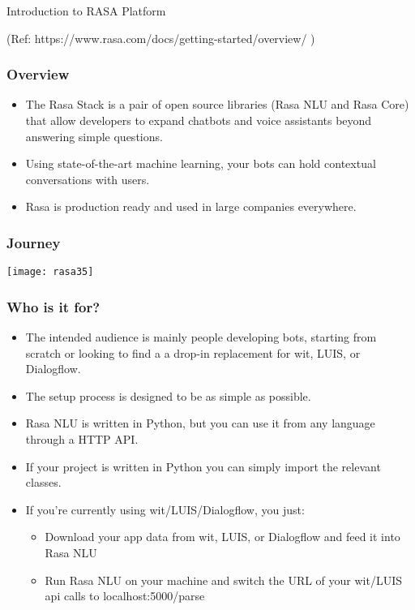 \begin{frame}[fragile]\frametitle{}
\begin{center}
{\Large Introduction to RASA Platform}

{\tiny (Ref: https://www.rasa.com/docs/getting-started/overview/ )}
\end{center}
\end{frame}



 \begin{frame}[fragile]\frametitle{Overview}
\begin{itemize}
\item The Rasa Stack is a pair of open source libraries (Rasa NLU and Rasa Core) that allow developers to expand chatbots and voice assistants beyond answering simple questions. 
\item Using state-of-the-art machine learning, your bots can hold contextual conversations with users. 
\item Rasa is production ready and used in large companies everywhere.
\end{itemize}


\end{frame}


 \begin{frame}[fragile]\frametitle{Journey}

\begin{center}
\texttt{[image: rasa35]}
\end{center}

\end{frame}


 \begin{frame}[fragile]\frametitle{Who is it for?}
\begin{itemize}
\item The intended audience is mainly people developing bots, starting from scratch or looking to find a a drop-in replacement for wit, LUIS, or Dialogflow. 
\item The setup process is designed to be as simple as possible. 
\item Rasa NLU is written in Python, but you can use it from any language through a HTTP API. 
\item If your project is written in Python you can simply import the relevant classes. 
\item If you're currently using wit/LUIS/Dialogflow, you just:
\begin{itemize}
\item Download your app data from wit, LUIS, or Dialogflow and feed it into Rasa NLU
\item Run Rasa NLU on your machine and switch the URL of your wit/LUIS api calls to localhost:5000/parse
\end{itemize}
\end{itemize}
\end{frame}


